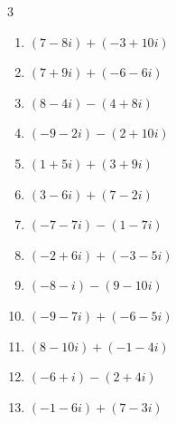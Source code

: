 \begin{multicols}{3}
\begin{enumerate}
        \phantom{$\displaystyle =7-3i$}

  \item $\displaystyle (7-8i) + (-3+10i)$

        \phantom{$\displaystyle =4+2i$}

  \item $\displaystyle (7+9i) + (-6-6i)$

        \phantom{$\displaystyle =1+3i$}

\columnbreak %

  \item $\displaystyle (8-4i) - (4+8i)$

        \phantom{$\displaystyle =4-12i$}

  \item $\displaystyle (-9-2i) - (2+10i)$

        \phantom{$\displaystyle =-11-12i$}

  \item $\displaystyle (1+5i) + (3+9i)$

        \phantom{$\displaystyle =4+14i$}

  \item $\displaystyle (3-6i) + (7-2i)$

        \phantom{$\displaystyle =10-8i$}

  \item $\displaystyle (-7-7i) - (1-7i)$

        \phantom{$\displaystyle =-8$}

  \item $\displaystyle (-2+6i) + (-3-5i)$

        \phantom{$\displaystyle =-5+i$}

  \item $\displaystyle (-8-i) - (9-10i)$

        \phantom{$\displaystyle =-17+9i$}

  \item $\displaystyle (-9-7i) + (-6-5i)$

        \phantom{$\displaystyle =-15-12i$}

  \item $\displaystyle (8-10i) + (-1-4i)$

        \phantom{$\displaystyle =7-14i$}

  \item $\displaystyle (-6+i) - (2+4i)$

        \phantom{$\displaystyle =-8-3i$}

  \item $\displaystyle (-1-6i) + (7-3i)$


\end{enumerate}
\end{multicols}
